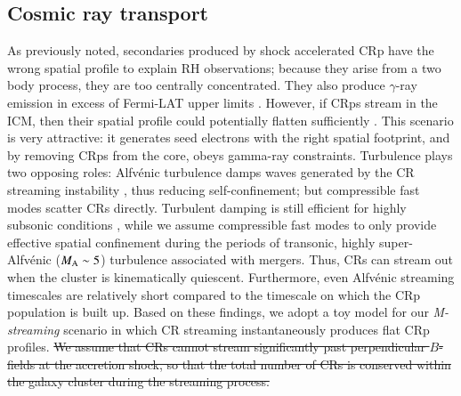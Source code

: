 \documentclass[a4paper,fleqn,usenatbib]{mnras}
\newcommand{\Mstream}{{\it M-streaming}\xspace}
\begin{document}
\subsection{Cosmic ray transport}
As previously noted, secondaries produced by shock accelerated CRp
have the wrong spatial profile to explain RH observations; because
they arise from a two body process, they are too centrally
concentrated. They also produce $\gamma$-ray emission in excess of
Fermi-LAT upper limits
\citep{2012ApJ...757..123A,brunetti12,2014ApJ...787...18A}. However,
if CRps stream in the ICM, then their spatial profile could
potentially flatten sufficiently \citep{ensslin11,wiener13}. This
scenario is very attractive: it generates seed electrons with the
right spatial footprint, and by removing CRps from the core, obeys
gamma-ray constraints. Turbulence plays two opposing roles:
Alfv{\'e}nic turbulence damps waves generated by the CR streaming
instability \citep{yan02,farmer04}, thus reducing self-confinement;
but compressible fast modes scatter CRs directly. Turbulent damping is
still efficient for highly subsonic conditions \citep{wiener13}, while
we assume compressible fast modes to only provide effective spatial
confinement during the periods of transonic, highly super-Alfv{\'e}nic
($M_{\rm A} \sim 5$) turbulence associated with mergers. Thus, CRs can
stream out when the cluster is kinematically quiescent. Furthermore,
even Alfv{\'e}nic streaming timescales are relatively short
\cite[$\sim 0.1-0.5$ Gyr;][]{wiener13} compared to the timescale on
which the CRp population is built up. Based on these findings, we
adopt a toy model for our \Mstream scenario in which CR streaming
instantaneously produces flat CRp profiles. \sout{We assume that CRs cannot
stream significantly past perpendicular $B$-fields at the accretion
shock, so that the total number of CRs is conserved within the galaxy
cluster during the streaming process.}
\end{document}
